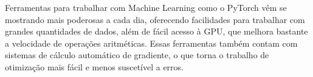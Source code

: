 
Ferramentas para trabalhar
com Machine Learning como o
PyTorch vêm se mostrando
mais poderosas
a cada dia, oferecendo
facilidades para trabalhar 
com grandes quantidades de dados,
além de fácil acesso à GPU,
que melhora bastante a velocidade
de operações aritméticas.
Essas ferramentas também 
contam com sistemas de cálculo automático
de gradiente, o que torna o trabalho
de otimização mais fácil e
menos suscetível a erros.






